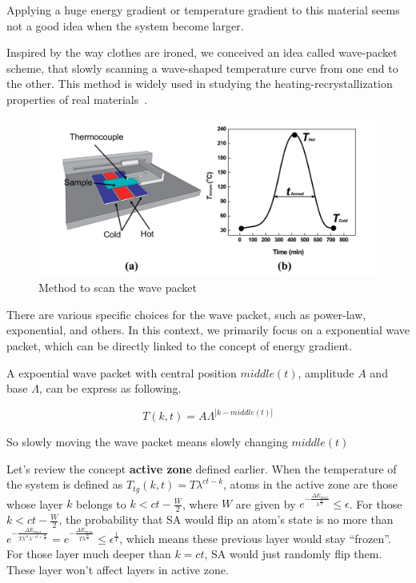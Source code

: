 \documentclass[twocolumn,superscriptaddress,english,showpacs,longbibliography]{revtex4-2}
\begin{document}
Applying a huge energy gradient or temperature gradient to this material
seems not a good idea when the system become larger.

Inspired by the way clothes are ironed, we conceived an idea called wave-packet scheme, that slowly
scanning a wave-shaped temperature curve from one end to the other. This
method is widely used in studying the heating-recrystallization
properties of real materials~\cite{Zhang2014}.

\begin{figure}[h]
\centering
\includegraphics[width=\columnwidth]{../notes/images/zhang2014.png}
\caption{Method to scan the wave packet}
\end{figure}

There are various specific choices for the wave packet, such as
power-law, exponential, and others. In this context, we primarily focus
on a exponential wave packet, which can be directly linked to the
concept of energy gradient.

A expoential wave packet with central position $middle(t)$, amplitude
$A$ and base $\Lambda$, can be express as following.

\[
T(k,t) = A\Lambda^{|k-middle(t)|}
\]

So slowly moving the wave packet means slowly changing $middle(t)$

Let's review the concept \textbf{active zone} defined earlier. When the
temperature of the system is defined as
$T_{tg}(k, t) = T\lambda^{ct-k}$, atoms in the active zone are those
whose layer $k$ belongs to $k<ct - \frac{W}{2}$, where $W$ are
given by
$e^{-\frac{\Delta E_{max}}{\lambda^{\frac{W}{2}}}}\leq \epsilon$. For
those $k<ct - \frac{W}{2}$, the probability that SA would flip an
atom's state is no more than
$e^{-\frac{\Delta E_{max}}{T\lambda^{ct}\lambda^{-ct + \frac{W}{2}}}}=e^{-\frac{\Delta E_{max}}{T\lambda^{\frac{W}{2}}}}\leq \epsilon^{\frac{1}{T}}$,
which means these previous layer would stay ``frozen''. For those layer
much deeper than $k = ct$, SA would just randomly flip them. These
layer won't affect layers in active zone.
\end{document}
